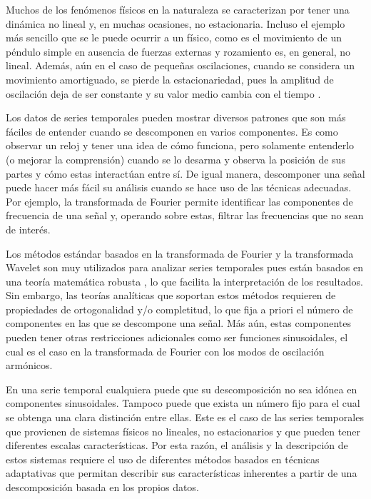 \noindent Muchos de los fenómenos físicos en la naturaleza se caracterizan por tener una dinámica no lineal \cite{strogatz_nonlinear_2015} y, en muchas ocasiones, no estacionaria. Incluso el ejemplo más sencillo que se le puede ocurrir a un físico, como es el movimiento de un péndulo simple en ausencia de fuerzas externas y rozamiento es, en general, no lineal. Además, aún en el caso de pequeñas oscilaciones, cuando se considera un movimiento amortiguado, se pierde la estacionariedad, pues la amplitud de oscilación deja de ser constante y su valor medio cambia con el tiempo \cite{Priestley, chatfield_analysis_2019}.        

Los datos de series temporales pueden mostrar diversos patrones que son más fáciles de entender cuando se descomponen en varios componentes. Es como observar un reloj y tener una idea de cómo funciona, pero solamente entenderlo (o mejorar la comprensión) cuando se lo desarma y observa la posición de sus partes y cómo estas interactúan entre sí. De igual manera, descomponer una señal puede hacer más fácil su análisis cuando se hace uso de las técnicas adecuadas. Por ejemplo, la transformada de Fourier permite identificar las componentes de frecuencia de una señal y, operando sobre estas, filtrar las frecuencias \cite{rao_fast_2010} que no sean de interés.   

Los métodos estándar basados en la transformada de Fourier y la transformada Wavelet son muy utilizados para analizar series temporales pues están basados en una teoría matemática robusta \cite{huang_empirical_1998, Percival}, lo que facilita la interpretación de los resultados. Sin embargo, las teorías analíticas que soportan estos métodos requieren de propiedades de ortogonalidad y/o completitud, lo que fija a priori el número de componentes en las que se descompone una señal. Más aún, estas componentes pueden tener otras restricciones adicionales como ser funciones sinusoidales, el cual es el caso en la transformada de Fourier con los modos de oscilación armónicos. 

En una serie temporal cualquiera puede que su descomposición no sea idónea en componentes sinusoidales. Tampoco puede que exista un número fijo para el cual se obtenga una clara distinción entre ellas. Este es el caso de las series temporales que provienen de sistemas físicos no lineales, no estacionarios y que pueden tener diferentes escalas características. Por esta razón, el análisis y la descripción de estos sistemas requiere el uso de diferentes métodos basados en técnicas adaptativas que permitan describir sus características inherentes a partir de una descomposición basada en los propios datos.

